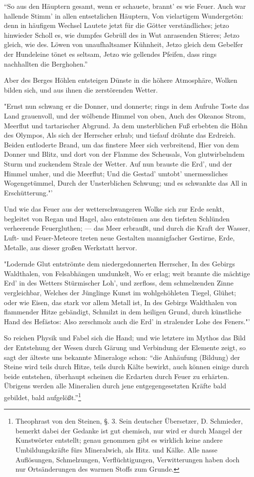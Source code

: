 \documentclass[a4paper, 11pt, oneside, polutonikogreek, german]{article}
\begin{document}
"`So aus den Häuptern gesamt, wenn er schauete, brannt' es wie Feuer. Auch war hallende Stimm' in allen entsetzlichen Häuptern, Von vielartigem Wundergetön: denn in häufigem Wechsel Lautete jetzt für die Götter verständliches; jetzo hinwieder Scholl es, wie dumpfes Gebrüll des in Wut anrasenden Stieres; Jetzo gleich, wie des. Löwen von unaufhaltsamer Kühnheit, Jetzo gleich dem Gebelfer der Hundeleine tönet es seltsam, Jetzo wie gellendes Pfeifen, dass rings nachhallten die Berghohen."'

Aber des Berges Höhlen entsteigen Dünste in die höhere Atmosphäre, Wolken bilden sich, und aus ihnen die zerstörenden Wetter.

"Ernst nun schwang er die Donner, und donnerte; rings in dem Aufruhe Toste das Land grauenvoll, und der wölbende Himmel von oben, Auch des Okeanos Strom, Meerflut und tartarischer Abgrund. Ja dem unsterblichen Fuß erbebten die Höhn des Olympos, Als sich der Herrscher erhub; und tiefauf dröhnte das Erdreich. Beiden entloderte Brand, um das finstere Meer sich verbreitend, Hier von dem Donner und Blitz, und dort von der Flamme des Scheusals, Von glutwirbelndem Sturm und zuckendem Strale der Wetter. Auf nun brauste die Erd', und der Himmel umher, und die Meerflut; Und die Gestad' umtobt' unermessliches Wogengetümmel, Durch der Unsterblichen Schwung; und es schwankte das All in Erschütterung."'

Und wie das Feuer aus der wetterschwangeren Wolke sich zur Erde senkt, begleitet von Regan und Hagel, also entströmen aus den tiefsten Schlünden verheerende Feuergluthen; --- das Meer erbraußt, und durch die Kraft der Wasser, Luft- und Feuer-Meteore treten neue Gestalten mannigfacher Gestirne, Erde, Metalle, aus dieser großen Werkstatt hervor.

"Lodernde Glut entströmte dem niedergedonnerten Herrscher, In des Gebirgs Waldthalen, von Felsabhängen umdunkelt, Wo er erlag; weit brannte die mächtige Erd' in des Wetters Stürmischer Loh', und zerfloss, dem schmelzenden Zinne vergleichbar, Welches der Jünglinge Kunst im wohlgehöhleten Tiegel, Glühet; oder wie Eisen, das stark vor allem Metall ist, In des Gebirgs Waldthalen von flammender Hitze gebändigt, Schmilzt in dem heiligen Grund, durch künstliche Hand des Hefästos: Also zerschmolz auch die Erd' in stralender Lohe des Feners."'

So reichen Physik und Fabel sich die Hand; und wie letztere im Mythos das Bild der Entstehung der Wesen durch Gärung und Verbindung der Elemente zeigt, so sagt der älteste uns bekannte Mineraloge schon: "`die Anhäufung (Bildung) der Steine wird teils durch Hitze, teils durch Kälte bewirkt, auch können einige durch beide entstehen, überhaupt scheinen die Erdarten durch Feuer zu erhärten. Übrigens werden alle Mineralien durch jene entgegengesetzten Kräfte bald gebildet, bald aufgelößt."'\footnote{Theophrast von den Steinen, §. 3. Sein deutscher Übersetzer, D. Schmieder, bemerkt dabei der Gedanke ist gut chemisch, nur wird er durch Mangel der Kunstwörter entstellt; genau genommen gibt es wirklich keine andere Umbildungskräfte fürs Mineralwich, als Hitz. und Kälke. Alle nasse Auflösungen, Schmelzungen, Verflüchtigungen, Verwitterungen haben doch nur Ortsänderungen des warmen Stoffs zum Grunde.}
\end{document}
